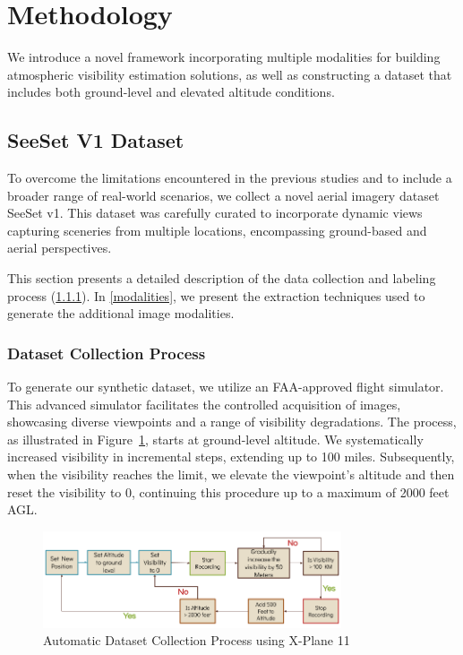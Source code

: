 \section{Methodology}
We introduce a novel framework incorporating multiple modalities for building atmospheric visibility estimation solutions, as well as constructing a dataset that includes both ground-level and elevated altitude conditions. 

\subsection{SeeSet V1 Dataset}
\label{sec:seeset}
To overcome the limitations encountered in the previous studies and to include a broader range of real-world scenarios, we collect a novel aerial imagery dataset SeeSet v1. This dataset was carefully curated to incorporate dynamic views capturing sceneries from multiple locations, encompassing ground-based and aerial perspectives. 

This section presents a detailed description of the data collection and labeling process (\ref{data_collection}). 
In \ref{modalities}, we present the extraction techniques used to generate the additional image modalities. 


\subsubsection{Dataset Collection Process}
\label{data_collection}

To generate our synthetic dataset, we utilize an FAA-approved flight simulator. This advanced simulator facilitates the controlled acquisition of images, showcasing diverse viewpoints and a range of visibility degradations. The process, as illustrated in Figure~\ref{fig:data_collection_process}, starts at ground-level altitude. We systematically increased visibility in incremental steps, extending up to 100 miles. Subsequently, when the visibility reaches the limit, we elevate the viewpoint's altitude and then reset the visibility to 0, continuing this procedure up to a maximum of 2000 feet AGL.


\begin{figure}[htbp]
\centerline{\includegraphics[width=250pt]{imgs/data_collection_pipeline.png}}
\caption{Automatic Dataset Collection Process using X-Plane 11}
\label{fig:data_collection_process}
\end{figure}
 

